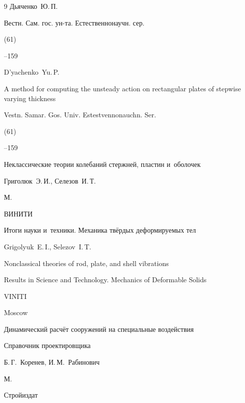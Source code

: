\begin{thebibliography}{9}
\by Дьяченко~Ю.\,П.

\jour Вестн. Сам. гос. ун-та. Естественнонаучн. сер.


(61)

--159

\misctransl

\by D'yachenko~Yu.\,P.

\paper A method for computing the unsteady action on rectangular plates of stepwise varying thickness

\jour Vestn. Samar. Gos. Univ. Estestvennonauchn. Ser.


(61)

--159






\book Неклассические теории колебаний стержней, пластин и~оболочек

\by Григолюк~Э.\,И., Селезов~И.\,Т.

\publaddr М.

\publ ВИНИТИ

\serial Итоги науки и~техники. Механика твёрдых  деформируемых тел




\misctransl

\by Grigolyuk~E.\,I., Selezov~I.\,T.

\book Nonclassical theories of rod, plate, and shell vibrations 

\serial Results in Science and Technology. Mechanics of Deformable Solids


\publ VINITI

\publaddr Moscow






\book Динамический расчёт сооружений на специальные воздействия

\bookinfo Справочник проектировщика

\eds Б.\,Г.~Коренев, И.\,М.~Рабинович

\publaddr М.

\publ Стройиздат


\end{thebibliography}
